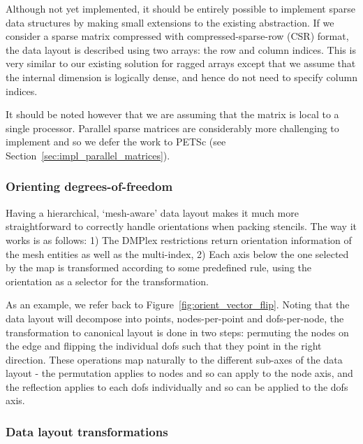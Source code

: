 Although not yet implemented, it should be entirely possible to implement sparse data structures by making small extensions to the existing abstraction.
If we consider a sparse matrix compressed with compressed-sparse-row (CSR) format, the data layout is described using two arrays: the row and column indices.
This is very similar to our existing solution for ragged arrays except that we assume that the internal dimension is logically dense, and hence do not need to specify column indices.

It should be noted however that we are assuming that the matrix is local to a single processor.
Parallel sparse matrices are considerably more challenging to implement and so we defer the work to PETSc (see Section~\ref{sec:impl_parallel_matrices}).

\subsubsection{Orienting degrees-of-freedom}
\label{sec:impl_orientation}

Having a hierarchical, `mesh-aware' data layout makes it much more straightforward to correctly handle orientations when packing stencils.
The way it works is as follows:
1) The DMPlex restrictions return orientation information of the mesh entities as well as the multi-index,
2) Each axis below the one selected by the map is transformed according to some predefined rule, using the orientation as a selector for the transformation.

As an example, we refer back to Figure~\ref{fig:orient_vector_flip}.
Noting that the data layout will decompose into points, nodes-per-point and \glspl{dof}-per-node, the transformation to canonical layout is done in two steps: permuting the nodes on the edge and flipping the individual \glspl{dof} such that they point in the right direction.
These operations map naturally to the different sub-axes of the data layout - the permutation applies to nodes and so can apply to the node axis, and the reflection applies to each \glspl{dof} individually and so can be applied to the \glspl{dof} axis.

\subsubsection{Data layout transformations}
\label{sec:impl_datalayoutopt}

